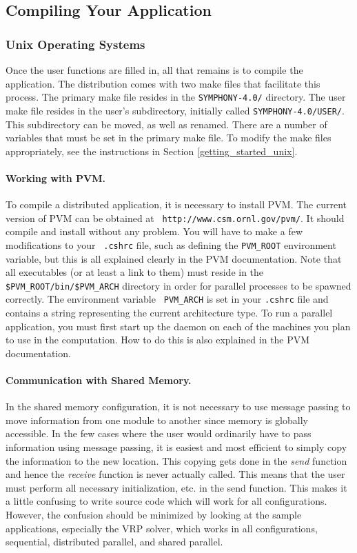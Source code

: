 \subsection{Compiling Your Application}

\subsubsection{Unix Operating Systems}

Once the user functions are filled in, all that remains is to compile the
application. The distribution comes with two make files that facilitate this
process. The primary make file resides in the {\tt SYMPHONY-4.0/} directory.
The user make file resides in the user's subdirectory, initially called
\texttt{SYMPHONY-4.0/USER/}. This subdirectory can be moved, as well as
renamed. There are a number of variables that must be set in the primary make
file. To modify the make files appropriately, see the instructions in Section
\ref{getting_started_unix}.

\paragraph{Working with PVM.}
\label{PVM}
To compile a distributed application, it is necessary to install PVM.
The current version of PVM can be obtained at {\tt
{}
{http://www.csm.ornl.gov/pvm/}}. It should compile and install without
any problem. You will have to make a few modifications to your {\tt
.cshrc} file, such as defining the {\tt PVM\_ROOT} environment
variable, but this is all explained clearly in the PVM documentation.
Note that all executables (or at least a link to them) must reside in
the {\tt \$PVM\_ROOT/bin/\$PVM\_ARCH} directory in order for parallel
processes to be spawned correctly. The environment variable {\tt
PVM\_ARCH} is set in your {\tt .cshrc} file and contains a string
representing the current architecture type. To run a parallel
application, you must first start up the daemon on each of the
machines you plan to use in the computation. How to do this is also
explained in the PVM documentation.

\paragraph{Communication with Shared Memory.}
\label{shared}
In the shared memory configuration, it is not necessary to use
message passing to move information from one module to another since
memory is globally accessible. In the few cases where the user would
ordinarily have to pass information using message passing, it is
easiest and most efficient to simply copy the information to the new
location. This copying gets done in the {\em send} function and hence
the {\em receive} function is never actually called. This means that
the user must perform all necessary initialization, etc. in the send
function. This makes it a little confusing to write source code which
will work for all configurations. However, the confusion should be
minimized by looking at the sample applications, especially the VRP solver,
which works in all configurations, sequential, distributed parallel, and
shared parallel. 

